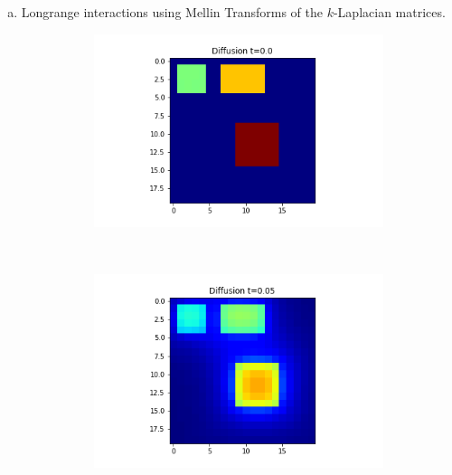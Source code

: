 \documentclass[10pt,a4paper]{article}
\begin{document}
\begin{enumerate}[i)]
\begin{enumerate}[a)]
         		\item Longrange interactions using Mellin Transforms of the $k$-Laplacian matrices.
         		\begin{figure}[!h]
         			\centering
         			\begin{subfigure}[b]{0.25\textwidth}
         				\includegraphics[width=\textwidth]{images/mellin-x2-t0.png}
         			\end{subfigure}~
         			\begin{subfigure}[b]{0.25\textwidth}
         				\includegraphics[width= \textwidth]{images/mellin-x2-t05.png}
         			\end{subfigure}~
         			\begin{subfigure}[b]{0.25\textwidth}

\end{subfigure}
\end{figure}
\end{enumerate}
\end{enumerate}
\end{document}
